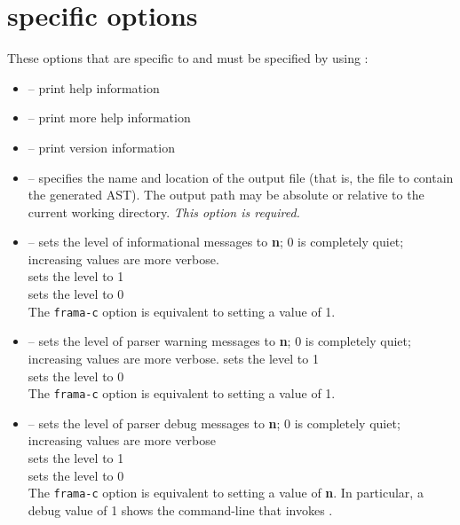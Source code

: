 \section{\irg specific options}
\label{sec:fcloptions}

These options that are specific to \irg and must be specified by using :
\begin{itemize}
	\item {} -- print help information
	\item {} -- print more help information
	\item {} -- print version information
	\item {} -- specifies the name and location of the output file (that is, the file to contain the generated AST). The output path may be absolute or relative to the current working directory. \textit{This option is required.}
	\item {} -- sets the level of informational messages to \textbf{n}; 0 is completely quiet; increasing values are
	more verbose. \\
	 sets the level to 1 \\
	 sets the level to 0\\
	 The \lstinline|frama-c| option  is equivalent to setting a value of 1.
	
	\item {} -- sets the level of parser warning messages to \textbf{n}; 0 is completely quiet; increasing values are
more verbose.  sets the level to 1\\
 sets the level to 0\\
The \lstinline|frama-c| option  is equivalent to setting a value of 1.

	\item {} -- sets the level of parser debug messages to \textbf{n}; 0 is completely quiet; increasing values are
more verbose\\
  sets the level to 1\\
 sets the level to 0\\
The \lstinline|frama-c| option  is equivalent to setting a value of \textbf{n}.
In particular, a debug value of 1 shows the command-line that invokes \irg.


\end{itemize}

